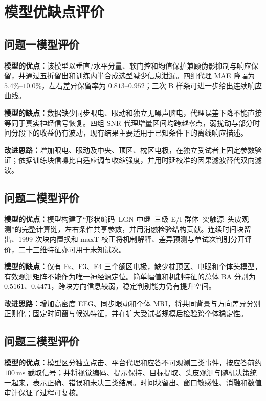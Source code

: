 \documentclass[a4paper,zihao=-4,linespread=1]{ctexart}
\numberwithin{figure}{section}       %
\begin{document}
\section{模型优缺点评价}
\subsection{问题一模型评价}

\textbf{模型的优点：}该模型以垂直/水平分量、软门控和均值保护兼顾伪影抑制与响应保留，并通过五折留出和训练内半合成选型减少信息泄漏。四组代理 MAE 降幅为 $5.4\%$--$10.0\%$，左右差异保留率为 $0.813$--$0.952$；三次 B 样条可进一步给出连续响应曲线。

\textbf{模型的缺点：}数据缺少同步眼电、眼动和独立无噪声脑电，代理误差下降不能直接等同于真实神经信号恢复。四组 SNR 代理增量区间均跨越零点，弱扰动与部分时间分段下的收益仍有波动，现有结果主要适用于已知条件下的离线响应描述。

\textbf{改进思路：}增加眼电、眼动及中央、顶区、枕区电极，在独立受试者上固定参数验证；依据训练块信噪比自适应调节收缩强度，并用时延校准的因果滤波替代双向滤波。

\subsection{问题二模型评价}

\textbf{模型的优点：}模型构建了“形状编码--LGN 中继--三级 E/I 群体--突触源--头皮观测”的完整计算链，左右条件共享参数，并用消融检验结构贡献。连续时间块留出、1999 次块内置换和 maxT 校正将机制解释、差异预测与单试次判别分开评价，二十三维特征亦可用于未知试次。

\textbf{模型的缺点：}仅有 Fz、F3、F4 三个额区电极，缺少枕顶区、电眼和个体头模型，有效观测矩阵不能作为唯一神经源定位。简单幅值和机制特征的总体 BA 分别为 $0.5161$、$0.4471$，跨块方向信息较弱，稳定判别能力仍有提升空间。

\textbf{改进思路：}增加高密度 EEG、同步眼动和个体 MRI，将共同背景与方向差异分别正则化；固定时间窗与候选特征，并在扩大受试者规模后检验跨个体稳定性。

\subsection{问题三模型评价}

\textbf{模型的优点：}模型区分独立点击、平台代理和应答不可观测三类事件，按应答前约 $100~\mathrm{ms}$ 截取信号；并将视觉编码、提示保持、目标提取、头皮观测与随机决策统一起来，表示正确、错误和未决三类结局。时间块留出、窗口敏感性、消融和数值审计保证了过程可复核。
\end{document}
